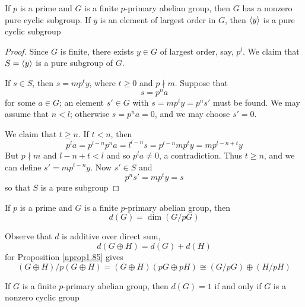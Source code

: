 \documentclass[11pt]{article}
\begin{document}
\begin{lemma}[]
If \(p\) is a prime and \(G\) is a finite \(p\)-primary abelian group, then \(G\)
has a nonzero pure cyclic subgroup. If \(y\) is an element of largest order
in \(G\), then \(\langle y\rangle\) is a pure cyclic subgroup
\end{lemma}

\begin{proof}
Since \(G\) is finite, there exists \(y\in G\) of largest order, say,
\(p^l\). We claim that \(S=\langle y\rangle\) is a pure subgroup of \(G\).

If \(s\in S\), then \(s=mp^ty\), where \(t\ge 0\) and \(p\nmid m\). Suppose
that 
\begin{equation*}
s=p^na
\end{equation*}
for some \(a\in G\); an element \(s'\in G\) with \(s=mp^ty=p^ns'\) must be
found. We may assume that \(n<l\); otherwise \(s=p^na=0\), and we may choose
\(s'=0\).

We claim that \(t\ge n\). If \(t<n\), then
\begin{equation*}
p^l a=p^{l-n}p^na=l^{l-n}s=p^{l-n}mp^ty=mp^{l-n+t}y
\end{equation*}
But \(p\nmid m\) and \(l-n+t<l\) and so \(p^la\neq 0\), a contradiction.
Thus \(t\ge n\), and we can define \(s'=mp^{t-n}y\). Now \(s'\in S\) and
\begin{equation*}
p^ns'=mp^ty=s
\end{equation*}
so that \(S\) is a pure subgroup
\end{proof}

\begin{definition}[]
If \(p\) is a prime and \(G\) is a finite \(p\)-primary abelian group, then
\begin{equation*}
d(G)=\dim(G/pG)
\end{equation*}
\end{definition}

Observe that \(d\) is additive over direct sum,
\begin{equation*}
d(G\oplus H)=d(G)+d(H)
\end{equation*}
for Proposition \ref{nprop1.85} gives
\begin{equation*}
(G\oplus H)/p(G\oplus H)=(G\oplus H)(pG\oplus pH)\cong
(G/pG)\oplus(H/pH)
\end{equation*}


\begin{lemma}[]
If \(G\) is a finite \(p\)-primary abelian group, then \(d(G)=1\) if and
only if \(G\) is a nonzero cyclic group
\end{lemma}
\end{document}
